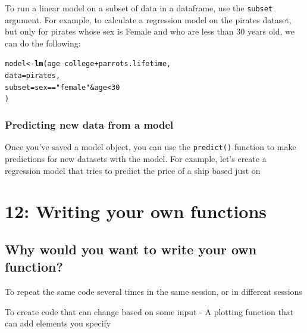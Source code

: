 \documentclass{tufte-book}\usepackage[]{graphicx}\usepackage[]{color}
\makeatletter
\newcommand{\hlnum}[1]{\textcolor[rgb]{0.686,0.059,0.569}{#1}}%
\newcommand{\hlstr}[1]{\textcolor[rgb]{0.192,0.494,0.8}{#1}}%
\newcommand{\hlopt}[1]{\textcolor[rgb]{0,0,0}{#1}}%
\newcommand{\hlstd}[1]{\textcolor[rgb]{0.345,0.345,0.345}{#1}}%
\newcommand{\hlkwb}[1]{\textcolor[rgb]{0.69,0.353,0.396}{#1}}%
\newcommand{\hlkwc}[1]{\textcolor[rgb]{0.333,0.667,0.333}{#1}}%
\newcommand{\hlkwd}[1]{\textcolor[rgb]{0.737,0.353,0.396}{\textbf{#1}}}%
\newenvironment{kframe}{%
 \def\at@end@of@kframe{}%
 \ifinner\ifhmode%
  \def\at@end@of@kframe{\end{minipage}}%
  \begin{minipage}{\columnwidth}%
 \fi\fi%
 \def\FrameCommand##1{\hskip\@totalleftmargin \hskip-\fboxsep
 \colorbox{shadecolor}{##1}\hskip-\fboxsep
     \hskip-\linewidth \hskip-\@totalleftmargin \hskip\columnwidth}%
 \MakeFramed {\advance\hsize-\width
   \@totalleftmargin\z@ \linewidth\hsize
   \@setminipage}}%
 {\par\unskip\endMakeFramed%
 \at@end@of@kframe}
\newenvironment{knitrout}{}{} %
\makeatother
\begin{document}
\begin{footnotesize}
To run a linear model on a subset of data in a dataframe, use the \texttt{subset} argument. For example, to calculate a regression model on the pirates dataset, but only for pirates whose sex is Female and who are less than 30 years old, we can do the following:

\begin{knitrout}
\color{fgcolor}\begin{kframe}
\begin{alltt}
\hlstd{model} \hlkwb{<-} \hlkwd{lm}\hlstd{(age} \hlopt{~} \hlstd{college} \hlopt{+} \hlstd{parrots.lifetime,}
            \hlkwc{data} \hlstd{= pirates,}
            \hlkwc{subset} \hlstd{= sex} \hlopt{==} \hlstr{"female"} \hlopt{&} \hlstd{age} \hlopt{<} \hlnum{30}
            \hlstd{)}
\end{alltt}
\end{kframe}
\end{knitrout}



\subsection{Predicting new data from a model}

Once you've saved a model object, you can use the \texttt{predict()} function to make predictions for new datasets with the model. For example, let's create a regression model that tries to predict the price of a ship based just on 





\chapter{12: Writing your own functions}
\label{ch:12}

\section{Why would you want to write your own function?}

To repeat the same code several times in the same session, or in different sessions

To create code that can change based on some input
- A plotting function that can add elements you specify


\end{footnotesize}
\end{document}
